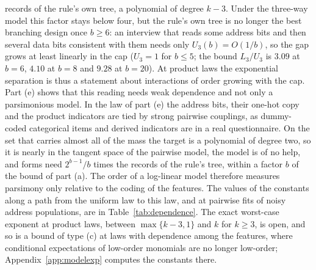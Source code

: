 records of the rule's own tree, a polynomial of degree $k-3$. Under the
three-way model this factor stays below four, but the rule's own tree is no
longer the best branching design once $b\ge6$: an interview that reads some
address bits and then several data bits consistent with them needs only
$U_3(b)=O(1/b)$, so the gap grows at least linearly in the cap ($U_3=1$ for
$b\le5$; the bound $L_3/U_3$ is $3.09$ at $b=6$, $4.10$ at $b=8$ and $9.28$ at
$b=20$). At product laws the exponential separation is thus a statement about
interactions of order growing with the cap. Part (e) shows that this reading
needs weak dependence and not only a parsimonious model. In the law of part
(e) the address bits, their one-hot copy and the product indicators are tied
by strong pairwise couplings, as dummy-coded categorical items and derived
indicators are in a real questionnaire. On the set that carries almost all of
the mass the target is a polynomial of degree two, so it is nearly in the
tangent space of the pairwise model, the model is of no help, and forms need $2^{b-1}/b$ times the records
of the rule's tree, within a factor $b$ of the bound of part (a). The order
of a log-linear model therefore measures parsimony only relative to the
coding of the features. The values of the constants along a path from the
uniform law to this law, and at pairwise fits of noisy address populations,
are in Table~\ref{tab:dependence}. The exact worst-case exponent at product laws,
between $\max\{k-3,1\}$ and $k$ for $k\ge3$, is open, and so is a bound of
type (c) at laws with dependence among the features, where conditional
expectations of low-order monomials are no longer low-order; Appendix~\ref{app:modelexp}
computes the constants there.

